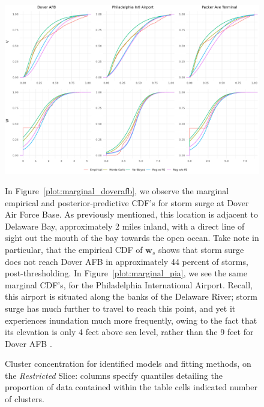 \begin{figure}[ht]
    \centering
    \includegraphics[width=0.95\linewidth]{./plots/delaware_marginal_cdfs.png}


In Figure~\ref{plot:marginal_doverafb}, we observe the marginal empirical and posterior-predictive
    CDF's for storm surge at Dover Air Force Base.  As previously mentioned, this location is adjacent
    to Delaware Bay, approximately 2 miles inland, with a direct line of sight out the mouth of the
    bay towards the open ocean.  Take note in particular, that the empirical CDF of $\bm{w}_s$ shows
    that storm surge does not reach Dover AFB in approximately \num{44} percent of storms, 
    post-thresholding.
In Figure~\ref{plot:marginal_pia}, we see the same marginal CDF's, for the Philadelphia International
    Airport.  Recall, this airport is situated along the banks of the Delaware River; storm surge
    has much further to travel to reach this point, and yet it experiences inundation much more 
    frequently, owing to the fact that its elevation is only 4 feet above sea level, 
    rather than the 9 feet for Dover AFB \makenote{[confirm]}.

\begin{table}[ht]
\centering
\caption{Cluster concentration for identified models and fitting 
        methods, on the \emph{Restricted} Slice: columns specify quantiles 
        detailing the proportion of data contained within the table cells 
        indicated number of clusters.\label{tab:cluster_concentration}} 

\end{table}


\end{figure}
